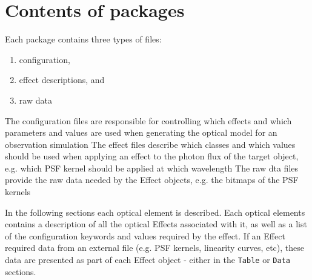 \section{Contents of packages%
  \label{contents-of-packages}%
}

Each package contains three types of files:

\begin{enumerate}
\item configuration,

\item effect descriptions, and

\item raw data
\end{enumerate}

The configuration files are responsible for controlling which effects and which parameters and values are used when generating the optical model for an observation simulation
The effect files describe which classes and which values should be used when applying an effect to the photon flux of the target object, e.g. which PSF kernel should be applied at which wavelength
The raw dta files provide the raw data needed by the Effect objects, e.g. the bitmaps of the PSF kernels

In the following sections each optical element is described.
Each optical elements contains a description of all the optical Effects associated with it, as well as a list of the configuration keywords and values required by the effect.
If an Effect required data from an external file (e.g. PSF kernels, linearity curves, etc), these data are presented as part of each Effect object - either in the \texttt{Table} or \texttt{Data} sections.

